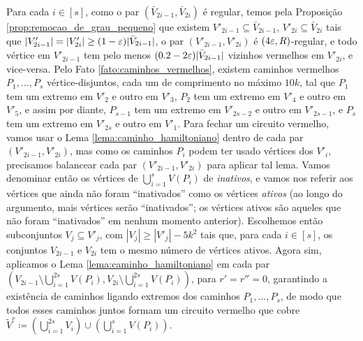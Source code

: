 Para cada $i\in [s]$, como o par $(\bar{V}_{2i-1}, \bar{V}_{2i})$ é regular, temos pela Proposição \ref{prop:remocao_de_grau_pequeno} que existem $V'_{2i-1}\subseteq\bar{V}_{2i-1}$, $V'_{2i}\subseteq\bar{V}_{2i}$ tais que $|V'_{2i-1}| = |V'_{2i}|\geq (1-\varepsilon)|\bar{V}_{2i-1}|$, o par $(V'_{2i-1}, V'_{2i})$ é $(4\varepsilon, R)$-regular, e todo vértice em $V'_{2i-1}$ tem pelo menos $(0.2-2\varepsilon)|\bar{V}_{2i-1}|$ vizinhos vermelhos em $V'_{2i}$, e vice-versa. Pelo Fato \ref{fato:caminhos_vermelhos}, existem caminhos vermelhos $P_1, \dots, P_s$ vértice-disjuntos, cada um de comprimento no máximo $10k$, tal que $P_1$ tem um extremo em $V'_2$ e outro em $V'_3$, $P_2$ tem um extremo em $V'_4$ e outro em $V'_5$, e assim por diante, $P_{s-1}$ tem um extremo em $V'_{2s-2}$ e outro em $V'_{2s-1}$, e $P_s$ tem um extremo em $V'_{2s}$ e outro em $V'_1$. Para fechar um circuito vermelho, vamos usar o Lema \ref{lema:caminho_hamiltoniano} dentro de cada par $(V'_{2i-1}, V'_{2i})$, mas como os caminhos $P_i$ podem ter usado vértices dos $V'_i$, precisamos balancear cada par $(V'_{2i-1}, V'_{2i})$ para aplicar tal lema. Vamos denominar então os vértices de $\bigcup_{i=1}^{s}V(P_i)$ de \emph{inativos}, e vamos nos referir aos vértices que ainda não foram ``inativados'' como os vértices \emph{ativos} (ao longo do argumento, mais vértices serão ``inativados''; os vértices ativos são aqueles que não foram ``inativados'' em nenhum momento anterior). Escolhemos então subconjuntos $V_j\subseteq V'_j$, com $|V_j|\geq |V'_j| - 5k^2$ tais que, para cada $i\in [s]$, os conjuntos $V_{2i-1}$ e $V_{2i}$ tem o mesmo número de vértices ativos. Agora sim, aplicamos o Lema \ref{lema:caminho_hamiltoniano} em cada par $(V_{2i-1}\setminus\bigcup_{i=1}^{2s} V(P_i), V_{2i}\setminus\bigcup_{i=1}^{2s} V(P_i))$, para $r'=r''=0$, garantindo a existência de caminhos ligando extremos dos caminhos $P_1, \dots, P_s$, de modo que todos esses caminhos juntos formam um circuito vermelho que cobre $\tilde{V}^r\coloneqq(\bigcup_{i=1}^{2s}V_i)\cup (\bigcup_{i=1}^{s}V(P_i))$.

